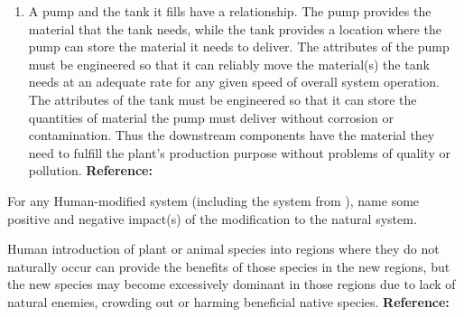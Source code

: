 \begin{exercises}
\begin{solution}
\begin{enumerate}[label=\alph*)]
            \item A pump and the tank it fills have a relationship. The pump provides the material that the tank needs, while the tank provides a location where the pump can store the material it needs to deliver. The attributes of the pump must be engineered so that it can reliably move the material(s) the tank needs at an adequate rate for any given speed of overall system operation. The attributes of the tank must be engineered so that it can store the quantities of material the pump must deliver without corrosion or contamination. Thus the downstream components have the material they need to fulfill the plant’s production purpose without problems of quality or pollution. \textbf{Reference:} 
        \end{enumerate}
    \end{solution}
    
    \begin{exercise} 
    \label{sea-1-14}
        For any Human-modified system (including the system from ), name some positive and negative impact(s) of the modification to the natural system.
    \end{exercise}
    \begin{solution}
        Human introduction of plant or animal species into regions where they do not naturally occur can provide the benefits of those species in the new regions, but the new species may become excessively dominant in those regions due to lack of natural enemies, crowding out or harming beneficial native species. \textbf{Reference:}
    \end{solution}
    

\end{exercises}
